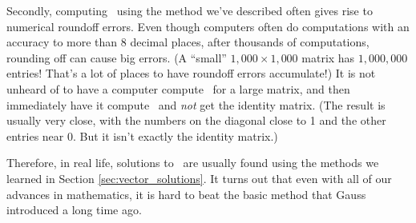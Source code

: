 Secondly, computing \ttai\ using the method we've described often gives rise to numerical roundoff errors. Even though computers often do computations with an accuracy to more than 8 decimal places, after thousands of computations, rounding off can cause big errors. (A ``small'' $1,000 \times 1,000$ matrix has $1,000,000$ entries! That's a lot of places to have roundoff errors accumulate!) It is not unheard of to have a computer compute \ttai\ for a large matrix, and then immediately have it compute \tta\ttai\ and \textit{not} get the identity matrix. (The result is usually very close, with the numbers on the diagonal close to 1 and the other entries near 0. But it isn't exactly the identity matrix.)

Therefore, in real life, solutions to \ttaxb\ are usually found using the methods we learned in Section \ref{sec:vector_solutions}. It turns out that even with all of our advances in mathematics, it is hard to beat the basic method that Gauss introduced a long time ago.

